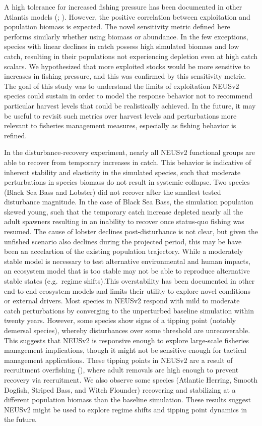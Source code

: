 \documentclass[
]{article}
\begin{document}
A high tolerance for increased fishing pressure has been documented in other Atlantis models (; ). However, the positive correlation between exploitation and population biomass is expected. The novel sensitivity metric defined here performs similarly whether using biomass or abundance. In the few exceptions, species with linear declines in catch possess high simulated biomass and low catch, resulting in their populations not experiencing depletion even at high catch scalars. We hypothesized that more exploited stocks would be more sensitive to increases in fishing pressure, and this was confirmed by this sensitivity metric. The goal of this study was to understand the limits of exploitation NEUSv2 species could sustain in order to model the response behavior not to recommend particular harvest levels that could be realistically achieved. In the future, it may be useful to revisit such metrics over harvest levels and perturbations more relevant to fisheries management measures, especially as fishing behavior is refined.

In the disturbance-recovery experiment, nearly all NEUSv2 functional groups are able to recover from temporary increases in catch. This behavior is indicative of inherent stability and elasticity in the simulated species, such that moderate perturbations in species biomass do not result in systemic collapse. Two species (Black Sea Bass and Lobster) did not recover after the smallest tested disturbance magnitude. In the case of Black Sea Bass, the simulation population skewed young, such that the temporary catch increase depleted nearly all the adult spawners resulting in an inability to recover once status-quo fishing was resumed. The cause of lobster declines post-disturbance is not clear, but given the unfished scenario also declines during the projected period, this may be have been an accelartion of the existing population trajectory. While a moderately stable model is necessary to test alternative environmental and human impacts, an ecosystem model that is too stable may not be able to reproduce alternative stable states (e.g.~regime shifts).This overstability has been documented in other end-to-end ecosystem models and limits their utility to explore novel conditions or external drivers. Most species in NEUSv2 respond with mild to moderate catch perturbations by converging to the unperturbed baseline simulation within twenty years. However, some species show signs of a tipping point (notably demersal species), whereby disturbances over some threshold are unrecoverable. This suggests that NEUSv2 is responsive enough to explore large-scale fisheries management implications, though it might not be sensitive enough for tactical management applications. These tipping points in NEUSv2 are a result of recruitment overfishing (), where adult removals are high enough to prevent recovery via recruitment. We also observe some species (Atlantic Herring, Smooth Dogfish, Striped Bass, and Witch Flounder) recovering and stabilizing at a different population biomass than the baseline simulation. These results suggest NEUSv2 might be used to explore regime shifts and tipping point dynamics in the future.
\end{document}
